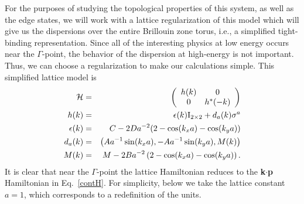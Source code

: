 \documentclass{article}
\begin{document}
For the purposes of studying the topological properties of this
system, as well as the edge states, we will work with a lattice
regularization of this model which will give us the dispersions over
the entire Brillouin zone torus, i.e., a simplified tight-binding
representation. Since all of the interesting physics at low energy
occurs near the $\Gamma$-point, the behavior of the dispersion at
high-energy is not important. Thus, we can choose a regularization
to make our calculations simple. This simplified lattice model is
\begin{eqnarray}
{\cal{H}}&=&\left(\begin{array}{cc} h(k)& 0\\
0&h^{*}(-k)\end{array}\right)\label{latticeH}\\
h(k)&=&\epsilon (k) {\rm{I}}_{2\times 2}+d_a(k)\sigma^a\nonumber\\
\epsilon (k)&=&C-2Da^{-2}(2-\cos (k_xa)-\cos (k_ya))\nonumber\\
d_a (k)&=&\left(Aa^{-1} \sin (k_xa),-Aa^{-1} \sin (k_ya),M(k)\right)\nonumber\\
M(k)&=&M -2Ba^{-2} \left(2-\cos(k_xa)-\cos (k_ya)\right)\nonumber.
\end{eqnarray}\noindent It is clear that near the
$\Gamma$-point the lattice Hamiltonian reduces to the {\bf
k$\cdot$p} Hamiltonian in Eq.~\ref{contH}. For simplicity, below we
take the lattice constant $a=1$, which corresponds to a redefinition
of the units.
\end{document}
